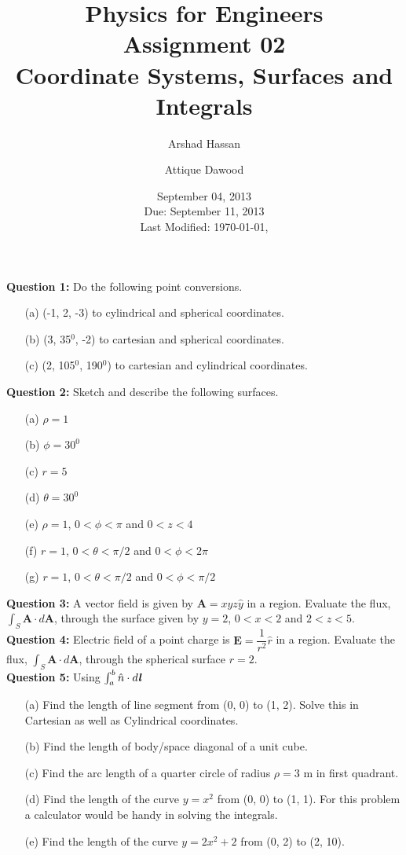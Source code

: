 \documentclass[12pt,a4paper]{article}
\title{\vspace{-3cm}Physics for Engineers\\Assignment 02\\Coordinate Systems, Surfaces and Integrals}
\author{Arshad Hassan\and Attique Dawood}
\date{September 04, 2013\\Due: September 11, 2013\\[0.2cm] Last Modified: \today, \currenttime}
\begin{document}
\maketitle
\noindent\textbf{Question 1:} Do the following point conversions.
\begin{itemize}
\item[(a)] (-1, 2, -3) to cylindrical and spherical coordinates.
\item[(b)] (3, 35$^0$, -2) to cartesian and spherical coordinates.
\item[(c)] (2, 105$^0$, 190$^0$) to cartesian and cylindrical coordinates.
\end{itemize}
\noindent\textbf{Question 2:} Sketch and describe the following surfaces.
\begin{itemize}
\item[(a)] $\rho=1$
\item[(b)] $\phi=30^0$
\item[(c)] $r=5$
\item[(d)] $\theta=30^0$
\item[(e)] $\rho=1$, $0<\phi<\pi$ and $0<z<4$
\item[(f)] $r=1$, $0<\theta<\pi/2$ and $0<\phi<2\pi$
\item[(g)] $r=1$, $0<\theta<\pi/2$ and $0<\phi<\pi/2$
\end{itemize}
\noindent\textbf{Question 3:} A vector field is given by $\textbf{A}=xyz\hat y$ in a region. Evaluate the flux, $\int_{S}\textbf{A}\cdot d\textbf{A}$, through the surface given by $y=2$, $0<x<2$ and $2<z<5$.\\[0.2cm]
\noindent\textbf{Question 4:} Electric field of a point charge is $\textbf{E}=\dfrac{1}{r^2}\hat r$ in a region. Evaluate the flux, $\int_{S}\textbf{A}\cdot d\textbf{A}$, through the spherical surface $r=2$.\\[0.2cm]
\noindent\textbf{Question 5:} Using $\int_{a}^{b}\hat n\cdot d\textbf{\textit{l}}$
\begin{itemize}
\item[(a)] Find the length of line segment from (0, 0) to (1, 2). Solve this in Cartesian as well as Cylindrical coordinates.
\item[(b)] Find the length of body/space diagonal of a unit cube.
\item[(c)] Find the arc length of a quarter circle of radius $\rho=3$ m in first quadrant.
\item[(d)] Find the length of the curve $y=x^2$ from (0, 0) to (1, 1). For this problem a calculator would be handy in solving the integrals.
\item[(e)] Find the length of the curve $y=2x^2+2$ from (0, 2) to (2, 10).
\end{itemize}
\end{document}
